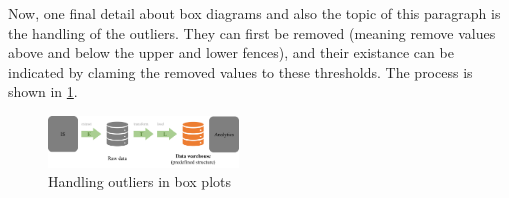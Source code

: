 Now, one final detail about box diagrams and also the topic of this paragraph is the handling of the outliers. They can first be removed (meaning remove values above and below the upper and lower fences), and their existance can be indicated by claming the removed values to these thresholds. The process is shown in \ref{fig:2_box_plot_outlier_handling}.

\begin{figure}[h]
  \centering
  \includegraphics[width=0.45\textwidth]{assets/basics/etl.png}%
  \caption{Handling outliers in box plots}
  \label{fig:2_box_plot_outlier_handling}
\end{figure}
